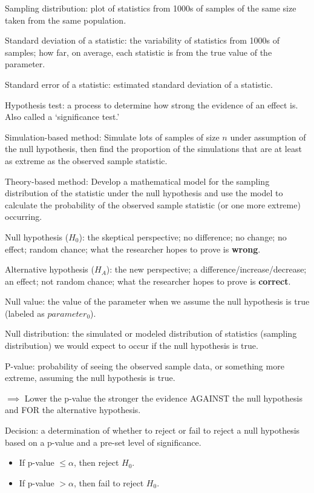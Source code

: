 \documentclass[
]{report}
\begin{document}
Sampling distribution: plot of statistics from 1000s of samples of the same size taken from the same population.

Standard deviation of a statistic: the variability of statistics from 1000s of samples; how far, on average, each statistic is from the true value of the parameter.

Standard error of a statistic: estimated standard deviation of a statistic.

Hypothesis test: a process to determine how strong the evidence of an effect is. Also called a `significance test.'

Simulation-based method: Simulate lots of samples of size \(n\) under assumption of the null hypothesis, then find the proportion of the simulations that are at least as extreme as the observed sample statistic.

Theory-based method: Develop a mathematical model for the sampling distribution of the statistic under the null hypothesis and use the model to calculate the probability of the observed sample statistic (or one more extreme) occurring.

Null hypothesis (\(H_0\)): the skeptical perspective; no difference; no change; no effect; random chance; what the researcher hopes to prove is \textbf{wrong}.

Alternative hypothesis (\(H_A\)): the new perspective; a difference/increase/decrease; an effect; not random chance; what the researcher hopes to prove is \textbf{correct}.

Null value: the value of the parameter when we assume the null hypothesis is true (labeled as \(parameter_0\)).

Null distribution: the simulated or modeled distribution of statistics (sampling distribution) we would expect to occur if the null hypothesis is true.

P-value: probability of seeing the observed sample data, or something more extreme, assuming the null hypothesis is true.

\(\implies\) Lower the p-value the stronger the evidence AGAINST the null hypothesis and FOR the alternative hypothesis.

Decision: a determination of whether to reject or fail to reject a null hypothesis based on a p-value and a pre-set level of significance.

\begin{itemize}
\item
  If p-value \(\leq \alpha\), then reject \(H_0\).
\item
  If p-value \(> \alpha\), then fail to reject \(H_0\).
\end{itemize}
\end{document}
